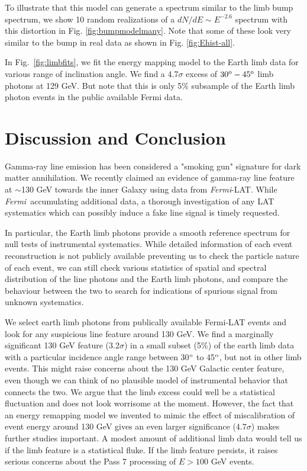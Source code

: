 \documentclass[aps,twocolumn,prd,superscriptaddress,showpacs,nofootinbib,fixfloat]{revtex4}
\newcommand{\Fermi}{{\slshape Fermi}}
\newcommand{\degree}{^{\rm o}}
\begin{document}
To illustrate that this model can generate a spectrum
similar to the limb bump spectrum, we show 10 random
realizations of a $dN/dE \sim E^{-2.6}$ spectrum with this
distortion in Fig. \ref{fig:bumpmodelmany}.  Note that some of these
look very similar to the bump in real data as shown in Fig. \ref{fig:Ehist-all}. 

In Fig.~\ref{fig:limbfits}, we fit the energy mapping model
to the Earth limb data for various range of inclination
angle. We find a 4.7$\sigma$ excess of $30\degree-45\degree$
limb photons at 129 GeV. But note that this is only 5\% subsample of the Earth limb photon events in the public available Fermi data.


\section{Discussion and Conclusion}

Gamma-ray line emission has been considered a "smoking gun" signature for dark matter annihilation. 
We recently claimed an evidence of gamma-ray line feature at
$\sim$130 GeV towards the inner Galaxy using data from
\Fermi-LAT. While \Fermi\ accumulating additional
data, a thorough investigation of any LAT systematics
which can possibly induce a fake line signal is timely requested.

In particular, the Earth limb photons provide a smooth
reference spectrum for null tests of instrumental
systematics. While detailed information of each event
reconstruction is not publicly available preventing us to
check the particle nature of each event, we can still check
various statistics of spatial and spectral distribution of
the line photons and the Earth limb photons, and compare the
behaviour between the two to search for indications of
spurious signal from unknown systematics. 

We select earth limb photons from publically available Fermi-LAT events and look for any suspicious line feature around 130 GeV.  We find a marginally significant 130 GeV feature (3.2$\sigma$) in a small
subset (5\%) of the earth limb data with a particular incidence angle range between 30$\degree$ to 45$\degree$, but not in other limb events.  This might raise concerns about
the 130 GeV Galactic center feature, even though we can
think of no plausible model of instrumental behavior that
connects the two.  We argue that the limb excess could well
be a statistical fluctuation and does not look worrisome at
the moment. However, the fact that an energy remapping model we invented to mimic the effect of miscalibration of event energy around 130 GeV
gives an even larger significance (4.7$\sigma$) makes further studies
important. A modest amount of additional limb data would
tell us if the limb feature is a statistical fluke.  If the
limb feature persists, it raises serious concerns about the
Pass 7 processing of $E > 100$ GeV events. 
\end{document}
